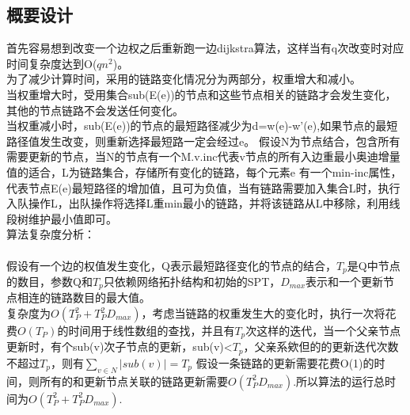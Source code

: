 \documentclass[UTF8,a4paper]{article}
\begin{document}
\subsection{概要设计}
首先容易想到改变一个边权之后重新跑一边dijkstra算法，这样当有q次改变时对应时间复杂度达到O($qn^2$)。\\
为了减少计算时间，采用的链路变化情况分为两部分，权重增大和减小。\\
当权重增大时，受用集合sub(E(e))的节点和这些节点相关的链路才会发生变化，其他的节点链路不会发送任何变化。\\
当权重减小时，sub(E(e))的节点的最短路径减少为d=w(e)-w'(e),如果节点的最短路径值发生改变，则重新选择最短路一定会经过e。
假设N为节点结合，包含所有需要更新的节点，当N的节点有一个M.v.inc代表v节点的所有入边重最小奥迪增量值的适合，L为链路集合，存储所有变化的链路，每个元素e
有一个min-inc属性，代表节点E(e)最短路径的增加值，且可为负值，当有链路需要加入集合L时，执行入队操作L，出队操作将选择L重min最小的链路，并将该链路从L中移除，利用线段树维护最小值即可。\\
算法复杂度分析：\\\\
假设有一个边的权值发生变化，Q表示最短路径变化的节点的结合，$T_p$是Q中节点的数目，参数Q和$T_p$只依赖网络拓扑结构和初始的SPT，$D_{max}$表示和一个更新节点相连的链路数目的最大值。\\
复杂度为$O(T_P^2+T_P^2D_{max})$，考虑当链路的权重发生大的变化时，执行一次将花费$O(T_P)$的时间用于线性数组的查找，并且有$T_p$次这样的迭代，当一个父亲节点更新时，有个sub(v)次子节点的更新，sub(v)<$T_p$，父亲系欸但的的更新迭代次数不超过$T_p$，则有$\sum_{v\in N}|sub(v)|=T_p$
假设一条链路的更新需要花费O(1)的时间，则所有的和更新节点关联的链路更新需要$O(T_P^2D_{max})$.所以算法的运行总时间为$O(T_P^2+T_P^2D_{max})$.
\end{document}

